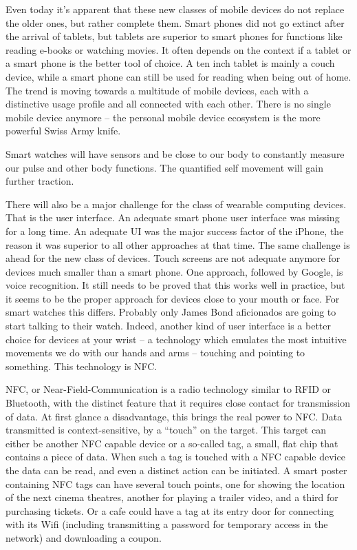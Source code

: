 \documentclass{article}
\begin{document}
Even today it’s apparent that these new classes of mobile devices do not replace the older ones, but rather complete them. Smart phones did not go extinct after the arrival of tablets, but tablets are superior to smart phones for functions like reading e-books or watching movies. It often depends on the context if a tablet or a smart phone is the better tool of choice. A ten inch tablet is mainly a couch device, while a smart phone can still be used for reading when being out of home. The trend is moving towards a multitude of mobile devices, each with a distinctive usage profile and all connected with each other. There is no single mobile device anymore – the personal mobile device ecosystem is the more powerful Swiss Army knife. 

Smart watches will have sensors and be close to our body to constantly measure our pulse and other body functions. The quantified self movement will gain further traction.

There will also be a major challenge for the class of wearable computing devices. That is the user interface. An adequate smart phone user interface was missing for a long time. An adequate UI was the major success factor of the iPhone, the reason it was superior to all other approaches at that time. The same challenge is ahead for the new class of devices. Touch screens are not adequate anymore for devices much smaller than a smart phone. One approach, followed by Google, is voice recognition. It still needs to be proved that this works well in practice, but it seems to be the proper approach for devices close to your mouth or face. For smart watches this differs. Probably only James Bond aficionados are going to start talking to their watch. Indeed, another kind of user interface is a better choice for devices at your wrist – a technology which emulates the most intuitive movements we do with our hands and arms – touching and pointing to something. This technology is NFC.

NFC, or Near-Field-Communication is a radio technology similar to RFID or Bluetooth, with the distinct feature that it requires close contact for transmission of data. At first glance a disadvantage, this brings the real power to NFC. Data transmitted is context-sensitive, by a “touch” on the target. This target can either be another NFC capable device or a so-called tag, a small, flat chip that contains a piece of data. When such a tag is touched with a NFC capable device the data can be read, and even a distinct action can be initiated. A smart poster containing NFC tags can have several touch points, one for showing the location of the next cinema theatres, another for playing a trailer video, and a third for purchasing tickets. Or a cafe could have a tag at its entry door for connecting with its Wifi (including transmitting a password for temporary access in the network) and downloading a coupon.
\end{document}

